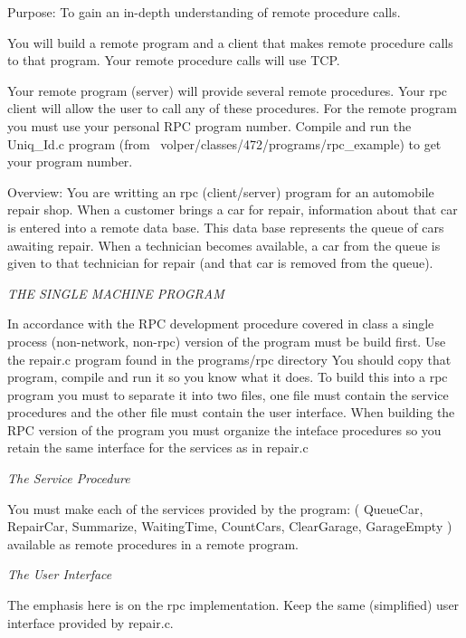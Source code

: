 

\parindent 0pt

Purpose: To gain an in-depth understanding of
remote procedure calls.

You will build a remote program and a client that makes remote procedure calls 
to that program.
Your remote procedure calls will use TCP.

Your remote program (server) will provide several remote procedures.
Your rpc client will allow the user to call any of these procedures.
For the remote program you must use your personal RPC program
number.
Compile and run the {\ltt{}Uniq_Id.c} program 
(from {\ltt{}~volper/classes/472/programs/rpc_example})
to get your program number.

Overview: You are writting an rpc (client/server) program for an automobile
repair shop. When a customer brings a car for repair, information about
that car is entered into a remote data base.
This data base represents the queue of cars awaiting repair. 
When a technician becomes available, a car from the queue is given to that 
technician for repair (and that car is removed from the queue).

{\it THE SINGLE MACHINE PROGRAM} 

In accordance with the RPC development procedure covered in class a
single process (non-network, non-rpc) version of the program must be
build first.
Use the {\ltt{}repair.c} program found in the
{\ltt{}programs/rpc} directory
You should copy that program, compile and run it so you know what it does.
To build this into a rpc program you must to separate it into two files,
one file must contain the service procedures
and the other file must contain the user interface.
When building the RPC version of the program you must
organize the inteface procedures so you retain the same interface
for the services as in {\ltt{}repair.c}

{\it The Service Procedure}

You must make each of the services provided by the program:
( {\ltt{}QueueCar}, {\ltt{}RepairCar}, {\ltt{}Summarize},
{\ltt{}WaitingTime}, {\ltt{}CountCars}, {\ltt{}ClearGarage},
{\ltt{}GarageEmpty} )
available as remote procedures in a remote program.

{\it The User Interface}

The emphasis here is on the rpc implementation.
Keep the same (simplified) user interface provided by {\ltt{}repair.c}.

